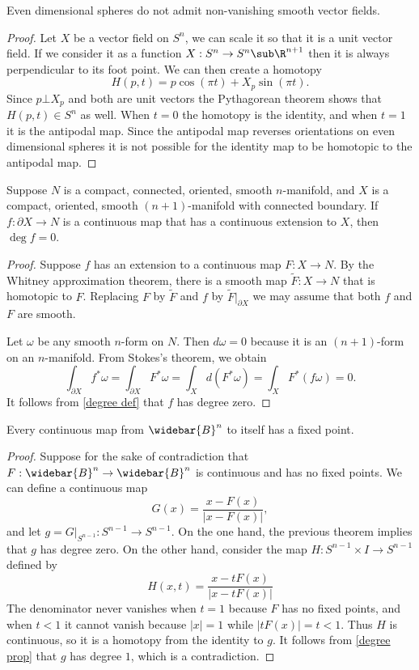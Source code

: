 \begin{proposition}
Even dimensional spheres do not admit non-vanishing smooth vector fields.
\end{proposition}
\begin{proof}
Let $X$ be a vector field on $S^n$, we can scale it so that it is a unit vector field. If we consider it as a function $X:S^n\to S^n\sub\R^{n+1}$ then it is always 
perpendicular to its foot point. We can then create a homotopy
\[H(p,t)=p\cos(\pi t)+X_p\sin(\pi t).\]
Since $p\bot X_p$ and both are unit vectors the Pythagorean theorem shows that $H(p,t)\in S^n$ as well. When $t=0$ the homotopy is the identity, and when $t=1$ it is the 
antipodal map. Since the antipodal map reverses orientations on even dimensional spheres it is not possible for the identity map to be homotopic to the antipodal map.
\end{proof}
\begin{theorem}
Suppose $N$ is a compact, connected, oriented, smooth $n$-manifold, and $X$ is a compact, oriented, smooth $(n+1)$-manifold with connected boundary. If $f:\partial X\to N$ is a continuous map that has a continuous extension to $X$, then $\deg f=0$.
\end{theorem}
\begin{proof}
Suppose $f$ has an extension to a continuous map $F:X\to N$. By the Whitney approximation theorem, there is a smooth map $\widetilde{F}:X\to N$ that is homotopic
to $F$. Replacing $F$ by $\widetilde{F}$ and $f$ by $\widetilde{F}|_{\partial X}$ we may assume that both $f$ and $F$ are smooth.\par
Let $\omega$ be any smooth $n$-form on $N$. Then $d\omega=0$ because it is an $(n+1)$-form on an $n$-manifold. From Stokes's theorem, we obtain
\[\int_{\partial X}f^*\omega=\int_{\partial X}F^*\omega=\int_Xd(F^*\omega)=\int_XF^*(f\omega)=0.\]
It follows from \cref{degree def} that $f$ has degree zero.
\end{proof}
\begin{theorem}
Every continuous map from $\widebar{B}^n$ to itself has a fixed point.
\end{theorem}
\begin{proof}
Suppose for the sake of contradiction that $F:\widebar{B}^n\to\widebar{B}^n$ is continuous and has no fixed points. We can define a continuous map
\[G(x)=\frac{x-F(x)}{|x-F(x)|},\]
and let $g=G|_{S^{n-1}}:S^{n-1}\to S^{n-1}$. On the one hand, the previous theorem implies that $g$ has degree zero. On the other hand, consider the map 
$H:S^{n-1}\times I\to S^{n-1}$ defined by
\[H(x,t)=\frac{x-tF(x)}{|x-tF(x)|}\]
The denominator never vanishes when $t=1$ because $F$ has no fixed points, and when $t<1$ it cannot vanish because $|x|=1$ while $|tF(x)|=t<1$. Thus $H$ is continuous, 
so it is a homotopy from the identity to $g$. It follows from \cref{degree prop} that $g$ has degree $1$, which is a contradiction.
\end{proof}
